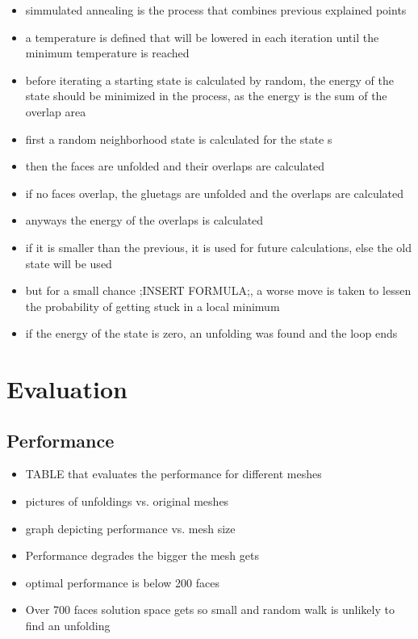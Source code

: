 \documentclass[draft,final]{vutinfth} %
\begin{document}
\begin{itemize}
	\item simmulated annealing is the process that combines previous explained points
	\item a temperature is defined that will be lowered in each iteration until the minimum temperature is reached
	\item before iterating a starting state is calculated by random, the energy of the state should be minimized in the process, as the energy is the sum of the overlap area
	\item first a random neighborhood state is calculated for the state s
	\item then the faces are unfolded and their overlaps are calculated
	\item if no faces overlap, the gluetags are unfolded and the overlaps are calculated
	\item anyways the energy of the overlaps is calculated	
	\item if it is smaller than the previous, it is used for future calculations, else the old state will be used
	\item but for a small chance ;INSERT FORMULA;, a worse move is taken to lessen the probability of getting stuck in a local minimum
	\item if the energy of the state is zero, an unfolding was found and the loop ends
\end{itemize}

\chapter{Evaluation}

\section{Performance}

\begin{itemize}
	\item TABLE that evaluates the performance for different meshes
	\item pictures of unfoldings vs. original meshes
	\item graph depicting performance vs. mesh size
	\item Performance degrades the bigger the mesh gets
	\item optimal performance is below 200 faces
	\item Over 700 faces solution space gets so small and random walk is unlikely to find an unfolding
\end{itemize}
\end{document}
